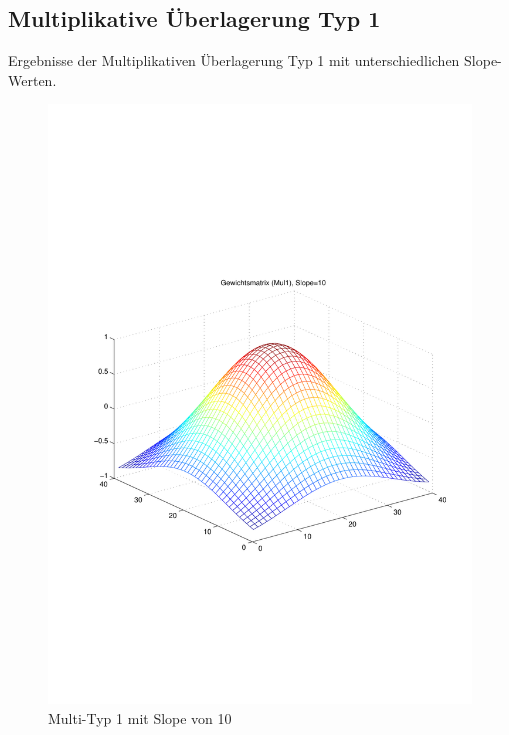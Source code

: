 \newpage
\subsection{Multiplikative Überlagerung Typ 1}
Ergebnisse der Multiplikativen Überlagerung Typ 1 mit unterschiedlichen Slope-Werten.
\begin{figure}[hbt]
	\begin{minipage}{0.48\textwidth}
		\includegraphics[trim=70 200 32 242, clip, width=\textwidth]{./Bilder/Auswertung/Gewichtsmatrix/Gewichtsmatrix_Mul1_Slope_10}
		\caption{Multi-Typ 1 mit Slope von 10}
		\label{Mul110}
	\end{minipage}
	\hfill
	\begin{minipage}{0.48\textwidth}

\end{minipage}
\end{figure}

